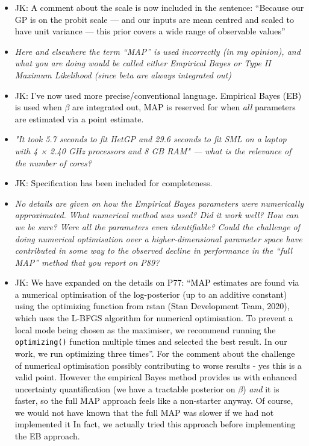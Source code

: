 \documentclass[12pt]{article}
\newcommand{\done}[2]{\item[#1]\textit{#2}}
\newcommand{\jack}[1]{\item{\textcolor{black}{JK: #1}}}
\begin{document}
\begin{itemize}
\jack{A comment about the scale is now included in the sentence: ``Because our GP is on the probit scale --- and our inputs are mean centred and scaled to have unit variance --- this prior covers a wide range of observable values''}

\done{P79}{Here and elsewhere the term ``MAP'' is used incorrectly (in my opinion), and what you are doing would be called either Empirical Bayes or Type II Maximum Likelihood (since beta are always integrated out)}

\jack{I've now used more precise/conventional language. Empirical Bayes (EB) is used when $\beta$ are integrated out, MAP is reserved for when \textit{all} parameters are estimated via a point estimate.}

\done{P84}{"It took 5.7 seconds to fit HetGP and 29.6 seconds to fit SML on a laptop with 4 × 2.40 GHz processors and 8 GB RAM" --- what is the relevance of the number of cores?}

\jack{Specification has been included for completeness.}

\done{P84}{  No details are given on how the Empirical Bayes parameters were numerically approximated.  What numerical method was used?  Did it work well?  How can we be sure?  Were all the parameters even identifiable?  Could the challenge of doing numerical optimisation over a higher-dimensional parameter space have contributed in some way to the observed decline in performance in the ``full MAP'' method that you report on P89?}

\jack{We have expanded on the details on P77: ``MAP estimates are found via a numerical optimisation of the log-posterior (up to an additive constant) using the optimizing function from rstan (Stan Development Team, 2020), which uses the L-BFGS algorithm for numerical optimisation. To prevent a local mode being chosen as the maximiser, we recommend running the \texttt{optimizing()} function multiple times and selected the best result. In our work, we run optimizing three times''. For the comment about the challenge of numerical optimisation possibly contributing to worse results - yes this is a valid point. However the empirical Bayes method provides us with enhanced uncertainty quantification (we have a tractable posterior on $\beta$) \textit{and} it is faster, so the full MAP approach feels like a non-starter anyway. Of course, we would not have known that the full MAP was slower if we had not implemented it In fact, we actually tried this approach before implementing the EB approach.}


\end{itemize}
\end{document}
